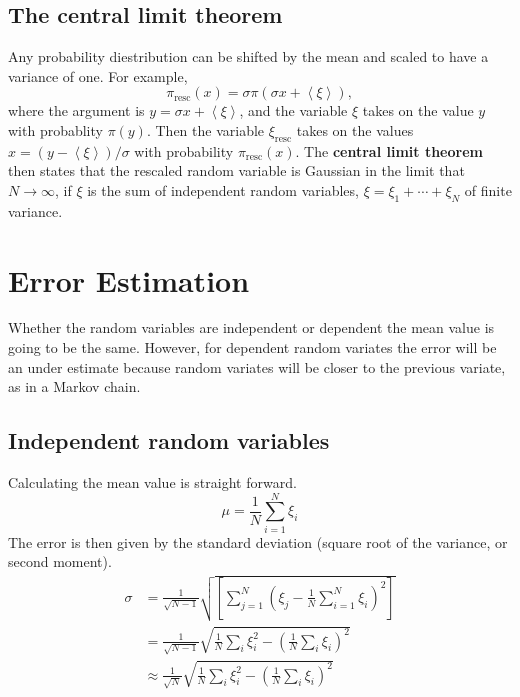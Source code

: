 \documentclass[12pt]{extarticle}
\begin{document}
\subsection{The central limit theorem}
Any probability diestribution can be shifted by the mean and scaled to have a variance of one. For example,
\begin{equation}
   \pi_{\mathrm{resc}}(x) = \sigma\pi(\sigma x+\left<\xi\right>),
\end{equation}
where the argument is $y=\sigma x+\left<\xi\right>$, and the variable $\xi$ takes on the value $y$ with probablity $\pi(y)$. Then the variable $\xi_\mathrm{resc}$ takes on the values $x=(y-\left<\xi\right>)/\sigma$ with probability $\pi_\mathrm{resc}(x)$. The \textbf{central limit theorem} then states that the rescaled random variable is Gaussian in the limit that $N\rightarrow\infty$, if $\xi$ is the sum of independent random variables, $\xi=\xi_1+\cdots+\xi_N$ of finite variance.

\section{Error Estimation}
Whether the random variables are independent or dependent the mean value is going to be the same. However, for dependent random variates the error will be an under estimate because random variates will be closer to the previous variate, as in a Markov chain.
\subsection{Independent random variables}
Calculating the mean value is straight forward.
\begin{equation}
   \mu = \frac{1}{N} \sum\limits_{i=1}^N \xi_i
\end{equation}
The error is then given by the standard deviation (square root of the variance, or second moment).
\begin{align}
   \sigma &= \frac{1}{\sqrt{N-1}}\sqrt{\left[\sum\limits_{j=1}^N\left(\xi_j-\frac{1}{N}\sum\limits_{i=1}^N \xi_i\right)^2\right]} \\
   &= \frac{1}{\sqrt{N-1}}\sqrt{\frac{1}{N}\sum\limits_i\xi_i^2 - \left(\frac{1}{N}\sum\limits_i\xi_i\right)^2} \\
   &\approx \frac{1}{\sqrt{N}}\sqrt{\frac{1}{N}\sum\limits_i\xi_i^2 - \left(\frac{1}{N}\sum\limits_i\xi_i\right)^2}
\end{align}
\end{document}
